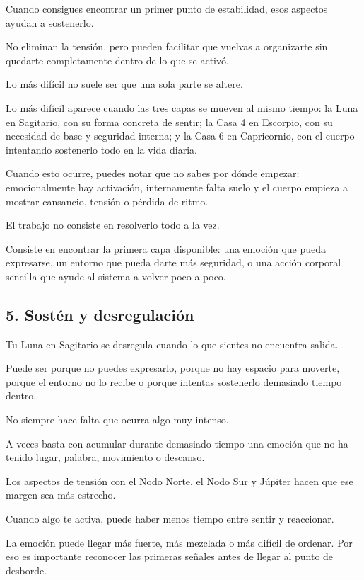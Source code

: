 \documentclass[11pt,a4paper]{article}
\begin{document}
Cuando consigues encontrar un primer punto de estabilidad, esos aspectos ayudan a sostenerlo.

No eliminan la tensión, pero pueden facilitar que vuelvas a organizarte sin quedarte completamente dentro de lo que se activó.

Lo más difícil no suele ser que una sola parte se altere.

Lo más difícil aparece cuando las tres capas se mueven al mismo tiempo:
la Luna en Sagitario, con su forma concreta de sentir;
la Casa 4 en Escorpio, con su necesidad de base y seguridad interna;
y la Casa 6 en Capricornio, con el cuerpo intentando sostenerlo todo en la vida diaria.

Cuando esto ocurre, puedes notar que no sabes por dónde empezar: emocionalmente hay activación, internamente falta suelo y el cuerpo empieza a mostrar cansancio, tensión o pérdida de ritmo.

El trabajo no consiste en resolverlo todo a la vez.

Consiste en encontrar la primera capa disponible: una emoción que pueda expresarse, un entorno que pueda darte más seguridad, o una acción corporal sencilla que ayude al sistema a volver poco a poco.

\subsection{5. Sostén y desregulación}

Tu Luna en Sagitario se desregula cuando lo que sientes no encuentra salida.

Puede ser porque no puedes expresarlo, porque no hay espacio para moverte, porque el entorno no lo recibe o porque intentas sostenerlo demasiado tiempo dentro.

No siempre hace falta que ocurra algo muy intenso.

A veces basta con acumular durante demasiado tiempo una emoción que no ha tenido lugar, palabra, movimiento o descanso.

Los aspectos de tensión con el Nodo Norte, el Nodo Sur y Júpiter hacen que ese margen sea más estrecho.

Cuando algo te activa, puede haber menos tiempo entre sentir y reaccionar.

La emoción puede llegar más fuerte, más mezclada o más difícil de ordenar. Por eso es importante reconocer las primeras señales antes de llegar al punto de desborde.
\end{document}

